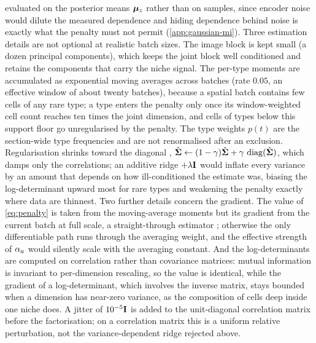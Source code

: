 evaluated on the posterior means $\boldsymbol{\mu}_z$ rather than on samples, since encoder noise would dilute the measured dependence and hiding dependence behind noise is exactly what the penalty must not permit (\cref{app:gaussian-mi}). Three estimation details are not optional at realistic batch sizes. The image block is kept small (a dozen principal components), which keeps the joint block well conditioned and retains the components that carry the niche signal. The per-type moments are accumulated as exponential moving averages across batches (rate $0.05$, an effective window of about twenty batches), because a spatial batch contains few cells of any rare type; a type enters the penalty only once its window-weighted cell count reaches ten times the joint dimension, and cells of types below this support floor go unregularised by the penalty. The type weights $p(t)$ are the section-wide type frequencies and are not renormalised after an exclusion. Regularisation shrinks toward the diagonal \citep{ledoit2004,schafer2005}, $\hat{\boldsymbol{\Sigma}} \leftarrow (1-\gamma)\hat{\boldsymbol{\Sigma}} + \gamma\,\operatorname{diag}(\hat{\boldsymbol{\Sigma}})$, which damps only the correlations; an additive ridge $+\lambda\mathbf{I}$ would inflate every variance by an amount that depends on how ill-conditioned the estimate was, biasing the log-determinant upward most for rare types and weakening the penalty exactly where data are thinnest. Two further details concern the gradient. The value of \cref{eq:penalty} is taken from the moving-average moments but its gradient from the current batch at full scale, a straight-through estimator \citep{bengio2013}; otherwise the only differentiable path runs through the averaging weight, and the effective strength of $\alpha_a$ would silently scale with the averaging constant. And the log-determinants are computed on correlation rather than covariance matrices: mutual information is invariant to per-dimension rescaling, so the value is identical, while the gradient of a log-determinant, which involves the inverse matrix, stays bounded when a dimension has near-zero variance, as the composition of cells deep inside one niche does. A jitter of $10^{-5}\mathbf{I}$ is added to the unit-diagonal correlation matrix before the factorisation; on a correlation matrix this is a uniform relative perturbation, not the variance-dependent ridge rejected above.

